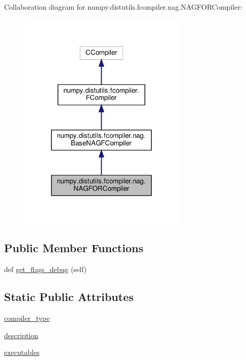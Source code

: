 Collaboration diagram for numpy.\+distutils.\+fcompiler.\+nag.\+N\+A\+G\+F\+O\+R\+Compiler\+:
\nopagebreak
\begin{figure}[H]
\begin{center}
\leavevmode
\includegraphics[width=227pt]{classnumpy_1_1distutils_1_1fcompiler_1_1nag_1_1NAGFORCompiler__coll__graph}
\end{center}
\end{figure}
\subsection*{Public Member Functions}
\begin{DoxyCompactItemize}
\item 
def \hyperlink{classnumpy_1_1distutils_1_1fcompiler_1_1nag_1_1NAGFORCompiler_af1bf93f7ef1313fcd2d11094f2b84ee5}{get\+\_\+flags\+\_\+debug} (self)
\end{DoxyCompactItemize}
\subsection*{Static Public Attributes}
\begin{DoxyCompactItemize}
\item 
\hyperlink{classnumpy_1_1distutils_1_1fcompiler_1_1nag_1_1NAGFORCompiler_a9877436976da250b86b4819c1c8ec032}{compiler\+\_\+type}
\item 
\hyperlink{classnumpy_1_1distutils_1_1fcompiler_1_1nag_1_1NAGFORCompiler_a1666fa59ed6ad13f2fc035528c3a25bd}{description}
\item 
\hyperlink{classnumpy_1_1distutils_1_1fcompiler_1_1nag_1_1NAGFORCompiler_a72c72a088315b011ff9607435117ef2c}{executables}
\end{DoxyCompactItemize}


